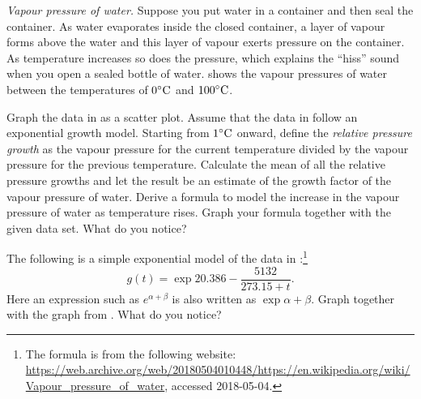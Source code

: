 \documentclass[a4paper,oneside,12pt]{article}
\begin{document}
\begin{problem}
\item\emph{Vapour pressure of water.}
  Suppose you put water in a container and then seal the container.
  As water evaporates inside the closed container, a layer of vapour
  forms above the water and this layer of vapour exerts pressure on
  the container.  As temperature increases so does the pressure, which
  explains the ``hiss'' sound when you open a sealed bottle of water.
   shows the vapour
  pressures of water between the temperatures of ${0}^{\circ}\textrm{C}$ and
  ${100}^{\circ}\textrm{C}$.
  \begin{packedenum}
  \item\label{subprob:exponential:water_mean_growth_factor}
    Graph the data in  as
    a scatter plot.  Assume that the data in
     follow an
    exponential growth model.  Starting from ${1}^{\circ}\textrm{C}$ onward,
    define the \emph{relative pressure growth} as the vapour pressure
    for the current temperature divided by the vapour pressure for the
    previous temperature.  Calculate the mean of all the relative
    pressure growths and let the result be an estimate of the growth
    factor of the vapour pressure of water.  Derive a formula to model
    the increase in the vapour pressure of water as temperature rises.
    Graph your formula together with the given data set.  What do you
    notice?

  \item\label{subprob:exponential:water_Wikipedia_formula}
    The following is a simple exponential model of the data in
    :\footnote{
      The formula is from the following website:
      \url{https://web.archive.org/web/20180504010448/https://en.wikipedia.org/wiki/Vapour_pressure_of_water},
      accessed 2018-05-04.
    }
    \begin{equation}
    \label{eqn:exponential:vapour_pressure_Wikipedia_formula}
    g(t)
    =
    \exp{
      20.386
      -
      \frac{5132}{273.15 + t}
    }.
    \end{equation}
    Here an expression such as $e^{\alpha + \beta}$ is also written as
    $\exp{\alpha + \beta}$.  Graph
    together with the graph
    from .  What do
    you notice?


\end{packedenum}
\end{problem}
\end{document}
